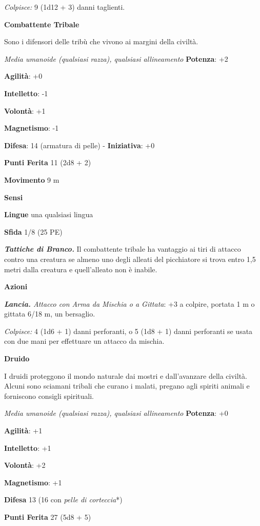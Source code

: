 \begin{multicols}{2}
\emph{Colpisce:} 9 (1d12 + 3) danni taglienti.

\textbf{Combattente Tribale}

Sono i difensori delle tribù che vivono ai margini della civiltà.

\emph{Media umanoide (qualsiasi razza), qualsiasi allineamento}
\textbf{Potenza}: +2

\textbf{Agilità}: +0

\textbf{Intelletto}: -1

\textbf{Volontà}: +1

\textbf{Magnetismo}: -1

\textbf{Difesa}: 14 (armatura di pelle) - \textbf{Iniziativa}: +0

\textbf{Punti Ferita} 11 (2d8 + 2)

\textbf{Movimento} 9 m

\textbf{Sensi} 

\textbf{Lingue} una qualsiasi lingua

\textbf{Sfida} 1/8 (25 PE)\smallskip

\emph{\textbf{Tattiche di Branco.}} Il combattente tribale ha vantaggio
ai tiri di attacco contro una creatura se almeno uno degli alleati del
picchiatore si trova entro 1,5 metri dalla creatura e quell'alleato non
è inabile.

\smallskip\textbf{Azioni}

\emph{\textbf{Lancia.} Attacco con Arma da Mischia o a Gittata}: +3 a
colpire, portata 1 m o gittata 6/18 m, un bersaglio.

\emph{Colpisce:} 4 (1d6 + 1) danni perforanti, o 5 (1d8 + 1) danni
perforanti se usata con due mani per effettuare un attacco da mischia.

\textbf{Druido}

I druidi proteggono il mondo naturale dai mostri e dall'avanzare della
civiltà. Alcuni sono sciamani tribali che curano i malati, pregano agli
spiriti animali e forniscono consigli spirituali.

\emph{Media umanoide (qualsiasi razza), qualsiasi allineamento}
\textbf{Potenza}: +0

\textbf{Agilità}: +1

\textbf{Intelletto}: +1

\textbf{Volontà}: +2

\textbf{Magnetismo}: +1

\textbf{Difesa} 13 (16 con \emph{pelle di corteccia}*)

\textbf{Punti Ferita} 27 (5d8 + 5)


\end{multicols}
